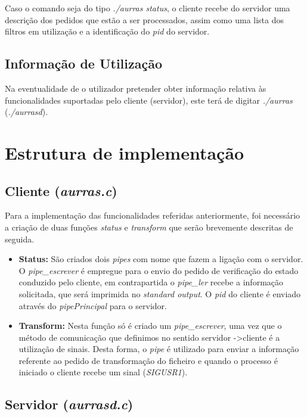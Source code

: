 \documentclass[11pt,a4paper]{report}
\begin{document}
Caso o comando seja do tipo \emph{./aurras status}, o cliente recebe do servidor uma descrição dos pedidos que estão a ser processados, assim como uma lista dos filtros em utilização e a identificação do \emph{pid} do servidor.

\section{Informação de Utilização}

Na eventualidade de o utilizador pretender obter informação relativa às funcionalidades suportadas pelo cliente (servidor), este terá de digitar \emph{./aurras} (\emph{./aurrasd}). 

\chapter{Estrutura de implementação}

\section{Cliente (\emph{aurras.c})}

Para a implementação das funcionalidades referidas anteriormente, foi necessário a criação de duas funções \emph{status} e \emph{transform} que serão brevemente descritas de seguida.

\begin{itemize}
\item \textbf{Status: } São criados dois \emph{pipes} com nome que fazem a ligação com o servidor. O \emph{pipe\_escrever} é empregue para o envio do pedido de verificação do estado conduzido pelo cliente, em contrapartida o \emph{pipe\_ler} recebe a informação solicitada, que será imprimida no \emph{standard output}. O \emph{pid} do cliente é enviado através do \emph{pipePrincipal} para o servidor.
\item \textbf{Transform: } Nesta função só é criado um \emph{pipe\_escrever}, uma vez que o método de comunicação que definimos no sentido servidor -\textgreater cliente é a utilização de sinais. Desta forma, o \emph{pipe} é utilizado para enviar a informação referente ao pedido de transformação do ficheiro e quando o processo é iniciado o cliente recebe um sinal (\emph{SIGUSR1}).
\end{itemize}

\section{Servidor (\emph{aurrasd.c})}
\end{document}
